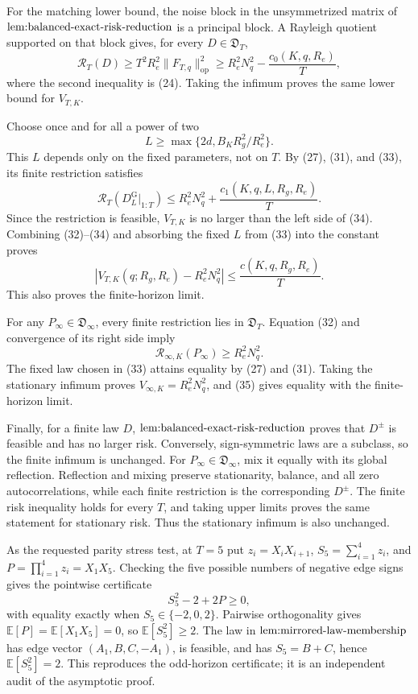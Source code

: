 For the matching lower bound, the noise block in the unsymmetrized matrix of \(\textnormal{lem:balanced-exact-risk-reduction}\) is a principal block.  A Rayleigh quotient supported on that block gives, for every \(D\in\mathfrak D_T\),
\[
\mathcal R_T(D)\ge T^2R_e^2\|F_{T,q}\|_{\mathrm{op}}^2
\ge R_e^2N_q^2-\frac{c_0(K,q,R_e)}{T}, \tag{32}
\]
where the second inequality is (24).  Taking the infimum proves the same lower bound for \(V_{T,K}\).

Choose once and for all a power of two
\[
L\ge\max\{2d,B_KR_g^2/R_e^2\}. \tag{33}
\]
This \(L\) depends only on the fixed parameters, not on \(T\).  By (27), (31), and (33), its finite restriction satisfies
\[
\mathcal R_T(D_L^{\mathrm G}|_{1:T})
\le R_e^2N_q^2+\frac{c_1(K,q,L,R_g,R_e)}{T}. \tag{34}
\]
Since the restriction is feasible, \(V_{T,K}\) is no larger than the left side of (34).  Combining (32)--(34) and absorbing the fixed \(L\) from (33) into the constant proves
\[
\left|V_{T,K}(q;R_g,R_e)-R_e^2N_q^2\right|
\le \frac{c(K,q,R_g,R_e)}{T}. \tag{35}
\]
This also proves the finite-horizon limit.

For any \(P_\infty\in\mathfrak D_\infty\), every finite restriction lies in \(\mathfrak D_T\).  Equation (32) and convergence of its right side imply
\[
\mathcal R_{\infty,K}(P_\infty)\ge R_e^2N_q^2. \tag{36}
\]
The fixed law chosen in (33) attains equality by (27) and (31).  Taking the stationary infimum proves \(V_{\infty,K}=R_e^2N_q^2\), and (35) gives equality with the finite-horizon limit.

Finally, for a finite law \(D\), \(\textnormal{lem:balanced-exact-risk-reduction}\) proves that \(D^{\pm}\) is feasible and has no larger risk.  Conversely, sign-symmetric laws are a subclass, so the finite infimum is unchanged.  For \(P_\infty\in\mathfrak D_\infty\), mix it equally with its global reflection.  Reflection and mixing preserve stationarity, balance, and all zero autocorrelations, while each finite restriction is the corresponding \(D^{\pm}\).  The finite risk inequality holds for every \(T\), and taking upper limits proves the same statement for stationary risk.  Thus the stationary infimum is also unchanged.

As the requested parity stress test, at \(T=5\) put \(z_i=X_iX_{i+1}\), \(S_5=\sum_{i=1}^4z_i\), and \(P=\prod_{i=1}^4z_i=X_1X_5\).  Checking the five possible numbers of negative edge signs gives the pointwise certificate
\[
S_5^2-2+2P\ge0, \tag{37}
\]
with equality exactly when \(S_5\in\{-2,0,2\}\).  Pairwise orthogonality gives \(\mathbb E[P]=\mathbb E[X_1X_5]=0\), so \(\mathbb E[S_5^2]\ge2\).  The law in \(\textnormal{lem:mirrored-law-membership}\) has edge vector \((A_1,B,C,-A_1)\), is feasible, and has \(S_5=B+C\), hence \(\mathbb E[S_5^2]=2\).  This reproduces the odd-horizon certificate; it is an independent audit of the asymptotic proof.

